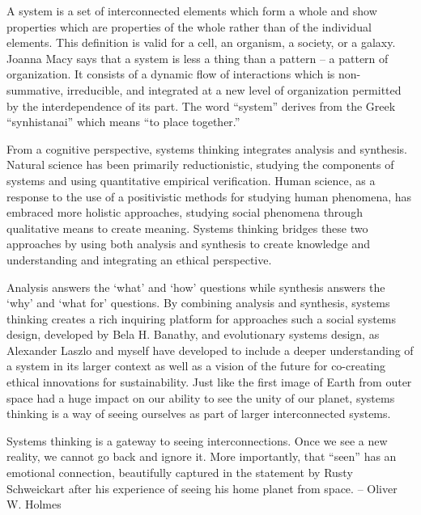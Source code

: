 A system is a set of interconnected elements which form a whole and show properties which are properties of the whole rather than of the individual elements. This definition is valid for a cell, an organism, a society, or a galaxy. Joanna Macy says that a system is less a thing than a pattern – a pattern of organization. It consists of a dynamic flow of interactions which is non-summative, irreducible, and integrated at a new level of organization permitted by the interdependence of its part. The word “system” derives from the Greek “synhistanai” which means “to place together.”

From a cognitive perspective, systems thinking integrates analysis and synthesis. Natural science has been primarily reductionistic, studying the components of systems and using quantitative empirical verification. Human science, as a response to the use of a positivistic methods for studying human phenomena, has embraced more holistic approaches, studying social phenomena through qualitative means to create meaning. Systems thinking bridges these two approaches by using both analysis and synthesis to create knowledge and understanding and integrating an ethical perspective.

Analysis answers the ‘what’ and ‘how’ questions while synthesis answers the ‘why’ and ‘what for’ questions. By combining analysis and synthesis, systems thinking creates a rich inquiring platform for approaches such a social systems design, developed by Bela H. Banathy, and evolutionary systems design, as Alexander Laszlo and myself have developed to include a deeper understanding of a system in its larger context as well as a vision of the future for co-creating ethical innovations for sustainability. Just like the first image of Earth from outer space had a huge impact on our ability to see the unity of our planet, systems thinking is a way of seeing ourselves as part of larger interconnected systems.

Systems thinking is a gateway to seeing interconnections. Once we see a new reality, we cannot go back and ignore it. More importantly, that “seen” has an emotional connection, beautifully captured in the statement by Rusty Schweickart after his experience of seeing his home planet from space. – Oliver W. Holmes

